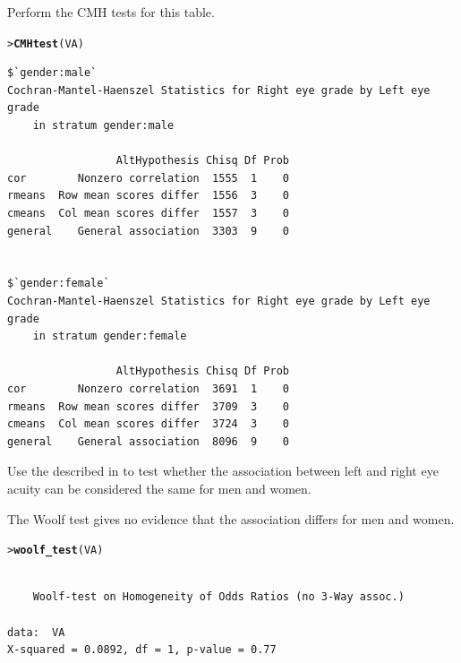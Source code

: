 \documentclass[10pt]{report}\usepackage[]{graphicx}\usepackage[]{color}
\makeatletter
\newcommand{\hlstd}[1]{\textcolor[rgb]{0.345,0.345,0.345}{#1}}%
\newcommand{\hlkwd}[1]{\textcolor[rgb]{0.737,0.353,0.396}{\textbf{#1}}}%
\newenvironment{kframe}{%
 \def\at@end@of@kframe{}%
 \ifinner\ifhmode%
  \def\at@end@of@kframe{\end{minipage}}%
  \begin{minipage}{\columnwidth}%
 \fi\fi%
 \def\FrameCommand##1{\hskip\@totalleftmargin \hskip-\fboxsep
 \colorbox{shadecolor}{##1}\hskip-\fboxsep
     \hskip-\linewidth \hskip-\@totalleftmargin \hskip\columnwidth}%
 \MakeFramed {\advance\hsize-\width
   \@totalleftmargin\z@ \linewidth\hsize
   \@setminipage}}%
 {\par\unskip\endMakeFramed%
 \at@end@of@kframe}
\newenvironment{knitrout}{}{} %
\renewenvironment{knitrout}{\small\renewcommand{\baselinestretch}{.85}}{} %
\makeatother
\begin{document}
\begin{Exercises}
\begin{enumerate*}
      \item Perform the CMH tests for this table.
      \begin{ans}
\begin{knitrout}\footnotesize
{}\color{fgcolor}\begin{kframe}
\begin{alltt}
\hlstd{> }\hlkwd{CMHtest}\hlstd{(VA)}
\end{alltt}
\begin{verbatim}
$`gender:male`
Cochran-Mantel-Haenszel Statistics for Right eye grade by Left eye grade 
	in stratum gender:male 

                 AltHypothesis Chisq Df Prob
cor        Nonzero correlation  1555  1    0
rmeans  Row mean scores differ  1556  3    0
cmeans  Col mean scores differ  1557  3    0
general    General association  3303  9    0


$`gender:female`
Cochran-Mantel-Haenszel Statistics for Right eye grade by Left eye grade 
	in stratum gender:female 

                 AltHypothesis Chisq Df Prob
cor        Nonzero correlation  3691  1    0
rmeans  Row mean scores differ  3709  3    0
cmeans  Col mean scores differ  3724  3    0
general    General association  8096  9    0
\end{verbatim}
\end{kframe}
\end{knitrout}

      \end{ans}
      
      \item Use the  described in  to
      test whether the association between left and right eye acuity can be
      considered the same for men and women.
      \begin{ans}
      The Woolf test gives no evidence that the association differs for men and women.
\begin{knitrout}\footnotesize
{}\color{fgcolor}\begin{kframe}
\begin{alltt}
\hlstd{> }\hlkwd{woolf_test}\hlstd{(VA)}
\end{alltt}
\begin{verbatim}

	Woolf-test on Homogeneity of Odds Ratios (no 3-Way assoc.)

data:  VA
X-squared = 0.0892, df = 1, p-value = 0.77
\end{verbatim}
\end{kframe}
\end{knitrout}
      \end{ans}
      

\end{enumerate*}
\end{Exercises}
\end{document}
